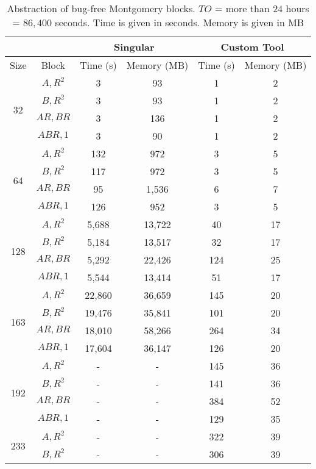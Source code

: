 \begin{table}[H]
\begin{center}
\caption{Abstraction of bug-free Montgomery blocks. $TO$ = more than $24$ hours = $86,400$ seconds. Time is given in seconds. Memory is given in MB}
\label{tab:absmontresults}
\begin{tabular}{|c|c||c|c||c|c|} 
\hline

\multicolumn{2}{|c|}{} & \multicolumn{2}{c||}{Singular} & \multicolumn{2}{c|}{Custom Tool} \\
	\hline

Size & Block    & Time (s)   & Memory (MB)& Time (s)   & Memory (MB)\\
\hline
\multirow{4}{*}{32} &
$A,R^2$      & 3   & 93 & 1   & 2\\
&$B,R^2$     & 3   & 93 &  1  & 2\\
&$AR,BR$     & 3   & 136 & 1   & 2\\
&$ABR,1$     & 3   & 90 & 1   & 2\\
\hline
\multirow{4}{*}{64} &
$A,R^2$      & 132  & 972 & 3   & 5\\
&$B,R^2$     & 117  & 972 & 3   & 5\\
&$AR,BR$     & 95   & 1,536 & 6   & 7\\
&$ABR,1$     & 126  & 952 & 3   & 5\\
\hline
\multirow{4}{*}{128} &
$A,R^2$      & 5,688 & 13,722 & 40   & 17\\
&$B,R^2$     & 5,184 & 13,517 & 32   & 17\\
&$AR,BR$     & 5,292 & 22,426 & 124   & 25\\
&$ABR,1$     & 5,544 & 13,414 & 51   & 17\\
\hline
\multirow{4}{*}{163} &
$A,R^2$      & 22,860   & 36,659   & 145  & 20\\
&$B,R^2$       & 19,476   & 35,841 & 101  & 20\\
&$AR,BR$       & 18,010   & 58,266 & 264  & 34\\
&$ABR,1$       & 17,604   & 36,147 & 126  & 20\\
\hline
\multirow{4}{*}{192} &
$A,R^2$      & - & - & 145  & 36\\
&$B,R^2$     & - & - & 141  & 36\\
&$AR,BR$     & - & - & 384  & 52\\
&$ABR,1$     & - & - & 129  & 35\\
\hline
\multirow{4}{*}{233} &
$A,R^2$      & - & - & 322   & 39\\
&$B,R^2$     & - & - & 306   & 39\\

\end{tabular}
\end{center}
\end{table}
